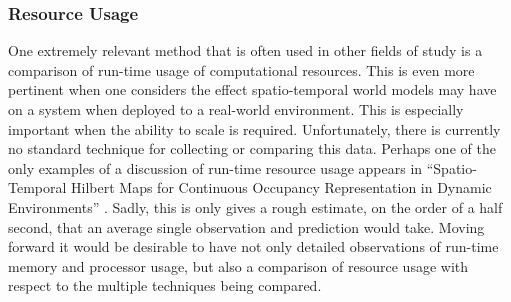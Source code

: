   \subsubsection { Resource Usage }

  One extremely relevant method that is often used in other fields of study
  is a comparison of run-time usage of computational resources. This is even
  more pertinent when one considers the effect spatio-temporal world models may
  have on a system when deployed to a real-world environment. This is especially
  important when the ability to scale is required. Unfortunately, there is currently
  no standard technique for collecting or comparing this data.
  Perhaps one of the only examples of a discussion of run-time resource usage
  appears in ``Spatio-Temporal Hilbert Maps for Continuous Occupancy Representation in Dynamic Environments'' \cite{Senanayake2016}.
  Sadly, this is only gives a rough estimate, on the order of a half second,
  that an average single observation and prediction would take. Moving forward
  it would be desirable to have not only detailed observations of run-time
  memory and processor usage, but also a comparison of resource usage with
  respect to the multiple techniques being compared.



